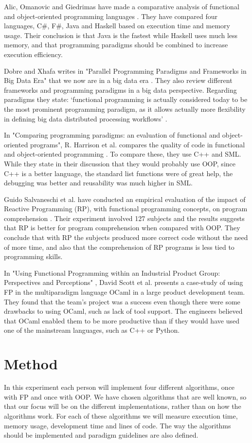 \documentclass {article}
\begin{document}
Alic, Omanovic and Giedrimas have made a comparative analysis of functional and object-oriented programming languages \cite{alomgi}. They have compared four languages, C\#, F\#, Java and Haskell based on execution time and memory usage. Their conclusion is that Java is the fastest while Haskell uses much less memory, and that programming paradigms should be combined to increase execution efficiency. 

Dobre and Xhafa writes in "Parallel Programming Paradigms and Frameworks in Big Data Era" that we now are in a big data era \cite{dobre}. They also review different frameworks and programming paradigms in a big data perspective. Regarding paradigms they state: ‘functional programming is actually considered today to be the most prominent programming paradigm, as it allows actually more flexibility in defining big data distributed processing workflows’ \cite{dobre}.

In "Comparing programming paradigms: an evaluation of functional and object-oriented programs", R. Harrison et al. compares the quality of code in functional and object-oriented programming \cite{hasmadole}. To compare these, they use C++ and SML. While they state in their discussion that they would probably use OOP, since C++ is a better language, the standard list functions were of great help, the debugging was better and reusability was much higher in SML.

Guido Salvaneschi et al. have conducted an empirical evaluation of the impact of Reactive Programming (RP), with functional programming concepts, on program comprehension \cite{saproamname}. Their experiment involved 127 subjects and the results suggests that RP is better for program comprehension when compared with OOP. They conclude that with RP the subjects produced more correct code without the need of more time, and also that the comprehension of RP programs is less tied to programming skills. 

In "Using Functional Programming within an Industrial Product Group: Perspectives and Perceptions" \cite{scomad}, David Scott et al. presents a case-study of using FP in the multiparadigm language OCaml in a large product development team. They found that the team's project was a success even though there were some drawbacks to using OCaml, such as lack of tool support. The engineers believed that OCaml enabled them to be more productive than if they would have used one of the mainstream languages, such as C++ or Python.
\section{Method}
In this experiment each person will implement four different algorithms, once with FP and once with OOP. We have chosen algorithms that are well known, so that our focus will be on the different implementations, rather than on how the algorithms work. For each of these algorithms we will measure execution time, memory usage, development time and lines of code. The way the algorithms should be implemented and paradigm guidelines are also defined.
\end{document}
